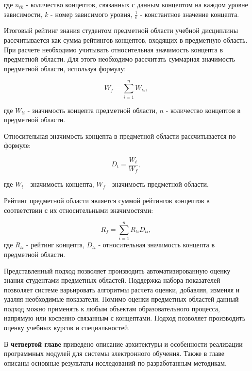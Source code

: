 где \(n_{tk}\) - количество концептов, связанных с данным концептом на каждом уровне зависимости, \(k\) - номер зависимого уровня, \( \frac{1}{e} \) - константное значение концепта. 

Итоговый рейтинг знания студентом предметной области учебной дисциплины рассчитывается как сумма рейтингов концептов, входящих в предметную область. При расчете необходимо учитывать относительная значимость концепта в предметной области. Для этого необходимо рассчитать суммарная значимость предметной области, используя формулу:

$$  
    W_f = \sum_{i=1}^{n}W_{ti},
$$

где \(W_{ti}\) - значимость концепта предметной области, \(n\) - количество концептов в предметной области.

Относительная значимость концепта в предметной области рассчитывается по формуле:

$$
    D_t = \frac{W_t}{W_f},
$$

где \(W_t\) - значимость концепта, \(W_f\) - значимость предметной области.

Рейтинг предметной области является суммой рейтингов концептов в соответствии с их относительными значимостями:

$$
    R_f = \sum_{i=1}^{n} R_{ti}D_{ti},
$$
где \(R_{ti}\) - рейтинг концепта, \(D_{ti}\) - относительная значимость концепта в предметной области.

Представленный подход позволяет производить автоматизированную оценку знания студентами предметных областей. Поддержка набора показателей позволяет системе варьировать алгоритмы расчета оценки, добавляя, изменяя и удаляя необходимые показатели. Помимо оценки предметных областей данный подход можно применять к любым объектам образовательного процесса, напрямую или косвенно связанным с концептами. Подход позволяет производить оценку учебных курсов и специальностей.  

В \textbf{четвертой главе} приведено описание архитектуры и особенности реализации программных модулей для системы электронного обучения. Также в главе описаны основные результаты исследований по разработанным методикам.

